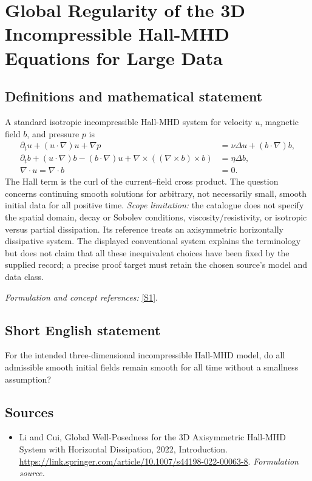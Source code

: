 \documentclass[11pt]{article}
\begin{document}
\section*{\texorpdfstring{Global Regularity of the 3D Incompressible Hall-MHD Equations for Large Data}{Global Regularity of the 3D Incompressible Hall-MHD Equations for Large Data}}\label{392}
\subsection{Definitions and mathematical statement}
A standard isotropic incompressible Hall-MHD system for velocity $u$, magnetic field $b$, and pressure $p$ is
\[
 \begin{aligned}
 \partial_tu+(u\cdot\nabla)u+\nabla p&=\nu\Delta u+(b\cdot\nabla)b,\\
 \partial_tb+(u\cdot\nabla)b-(b\cdot\nabla)u
   +\nabla\times((\nabla\times b)\times b)&=\eta\Delta b,\\
 \nabla\cdot u=\nabla\cdot b&=0.
 \end{aligned}
\]
The Hall term is the curl of the current--field cross product. The question concerns continuing smooth solutions for arbitrary, not necessarily small, smooth initial data for all positive time. \emph{Scope limitation:} the catalogue does not specify the spatial domain, decay or Sobolev conditions, viscosity/resistivity, or isotropic versus partial dissipation. Its reference treats an axisymmetric horizontally dissipative system. The displayed conventional system explains the terminology but does not claim that all these inequivalent choices have been fixed by the supplied record; a precise proof target must retain the chosen source's model and data class.
\par\smallskip\textit{Formulation and concept references:} \href{https://link.springer.com/article/10.1007/s44198-022-00063-8}{[S1]}.

\subsection{Short English statement}
For the intended three-dimensional incompressible Hall-MHD model, do all admissible smooth initial fields remain smooth for all time without a smallness assumption?
\subsection{Sources}
\begin{itemize}
\item[S1]Li and Cui, Global Well-Posedness for the 3D Axisymmetric Hall-MHD System with Horizontal Dissipation, 2022, Introduction.
\url{https://link.springer.com/article/10.1007/s44198-022-00063-8}.
\textit{Formulation source.}
\end{itemize}
\end{document}
